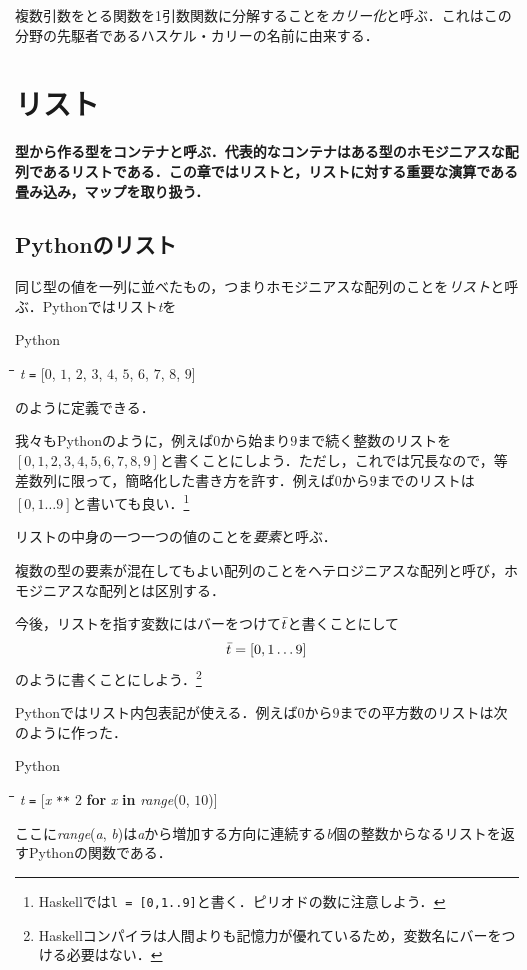 \documentclass[twocolumn]{jsbook}
\newcommand{\keyword}[1]{{\emph{#1}}}
\newcommand{\code}[1]{\texttt{#1}}
\newenvironment{leader}{\begingroup\bf}{\endgroup}
\newenvironment{pythoncode}{\begin{itembox}[r]{Python}}{\end{itembox}}
\newenvironment{python}{\begin{tabbing}\hspace*{1em}\=\hspace*{1em}\=\hspace*{1em}\=\hspace*{1em}\=\kill}{\end{tabbing}}
\newcommand{\pthnId}[1]{\textit{#1}}
\newcommand{\pthnKeyword}[1]{\textbf{#1}}
\newcommand{\pthnOp}[1]{\texttt{#1}}
\newcommand{\hsklList}[1]{\Bar{#1}}
\begin{document}
複数引数をとる関数を1引数関数に分解することを\keyword{カリー化}と呼ぶ．これはこの分野の先駆者であるハスケル・カリーの名前に由来する．



\chapter{リスト}
\begin{leader}
型から作る型をコンテナと呼ぶ．代表的なコンテナはある型のホモジニアスな配列であるリストである．この章ではリストと，リストに対する重要な演算である畳み込み，マップを取り扱う．
\end{leader}


\section{Pythonのリスト}

同じ型の値を一列に並べたもの，つまりホモジニアスな配列のことを\keyword{リスト}と呼ぶ．Pythonではリスト\pthnId{t}を
\begin{pythoncode}
\begin{python}
\pthnId{t} \pthnOp{=} [$0$, $1$, $2$, $3$, $4$, $5$, $6$, $7$, $8$, $9$]
\end{python}
\end{pythoncode}
のように定義できる．

我々もPythonのように，例えば$0$から始まり$9$まで続く整数のリストを$[0,1,2,3,4,5,6,7,8,9]$と書くことにしよう．ただし，これでは冗長なので，等差数列に限って，簡略化した書き方を許す．例えば$0$から$9$までのリストは$[0,1\dots9]$と書いても良い．\footnote{Haskellでは\code{l = [0,1..9]}と書く．ピリオドの数に注意しよう．}

リストの中身の一つ一つの値のことを\keyword{要素}と呼ぶ．

複数の型の要素が混在してもよい配列のことをヘテロジニアスな配列と呼び，ホモジニアスな配列とは区別する．

今後，リストを指す変数にはバーをつけて$\hsklList{t}$と書くことにして$$\hsklList{t}=[0,1\dots9]$$のように書くことにしよう．\footnote{Haskellコンパイラは人間よりも記憶力が優れているため，変数名にバーをつける必要はない．}

Pythonではリスト内包表記が使える．例えば$0$から$9$までの平方数のリストは次のように作った．
\begin{pythoncode}
\begin{python}
\pthnId{t} \pthnOp{=} [\pthnId{x} \pthnOp{**} $2$ \pthnKeyword{for} \pthnId{x} \pthnKeyword{in} \pthnId{range}($0$, $10$)]
\end{python}
\end{pythoncode}
ここに\pthnId{range}(\pthnId{a}, \pthnId{b})は\pthnId{a}から増加する方向に連続する\pthnId{b}個の整数からなるリストを返すPythonの関数である．
\end{document}
